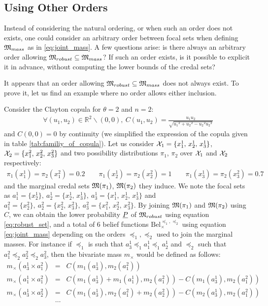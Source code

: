\subsection{Using Other Orders}
Instead of considering the natural ordering, or when such an order does not exists, one could consider an arbitrary order between focal sets when defining ${\mathfrak{M}}_{mass}$ as in \eqref{eq:joint_mass}. A few questions arise: is there always an arbitrary order allowing ${\mathfrak{M}}_{robust}\subseteq{\mathfrak{M}}_{mass}$? If such an order exists, is it possible to explicit it in advance, \ie without computing the lower bounds of the credal sets?

It appears that an order allowing ${\mathfrak{M}}_{robust}\subseteq{\mathfrak{M}}_{mass}$ does not always exist. To prove it, let us find an example where no order allows either inclusion.
\begin{example}
Consider the Clayton copula for $\theta=2$ and $n=2$:
\begin{eqnarray*}
    \forall (u_1,u_2)\in\mathbb{R}^2\backslash(0,0), ~C(u_1,u_2)=\frac{u_1u_2}{\sqrt{{u_1}^2+{u_2}^2-{u_2}^2{u_2}^2}}
\end{eqnarray*}
and $C(0,0)=0$ by continuity (we simplified the expression of the copula given in table \ref{tab:familiy_of_copula}). Let us consider ${\mathcal{X}}_1=\{x^1_1,\, x^1_2,\, x^1_3\}$, ${\mathcal{X}}_2=\{x^2_1,\, x^2_2,\, x^2_3\}$ and two possibility distributions $\pi_1$, $\pi_2$ over ${\mathcal{X}}_1$ and ${\mathcal{X}}_2$ respectively:
\begin{eqnarray*}
    \pi_1(x^1_1)=\pi_2(x^2_1)=0.2 \qquad \pi_1(x^1_2)=\pi_2(x^2_2)=1 \qquad \pi_1(x^1_3)=\pi_2(x^2_3)=0.7 
\end{eqnarray*}
and the marginal credal sets ${\mathfrak{M}}(\pi_1)$, ${\mathfrak{M}}(\pi_2)$ they induce. We note the focal sets as $a^1_1=\{x^1_2\},~a^1_2=\{x^1_2,\, x^1_3\},~a^1_3=\{x^1_1,\,x^1_2,\,x^1_3\}$ and $a^2_1=\{x^2_2\},~a^2_2=\{x^2_2,\, x^2_3\},~a^2_3=\{x^2_1,\, x^2_2,\, x^2_3\}$. By joining ${\mathfrak{M}}(\pi_1)$ and ${\mathfrak{M}}(\pi_2)$ using $C$, we can obtain the lower probability ${\underline{P}}$ of ${\mathfrak{M}}_{robust}$ using equation \eqref{eq:robust_set}, and a total of 6 belief functions $\mathrm{Bel}^{\preceq_1,\preceq_2}_\times$ using equation \eqref{eq:joint_mass} depending on the orders $\preceq_1, \preceq_2$ used to join the marginal masses. For instance if $\preceq_1$ is such that $a^1_3\preceq_1 a^1_1 \preceq_1 a^1_2$ and $\preceq_2$ such that $a^2_1 \preceq_2 a^2_2 \preceq_2 a^2_3$, then the bivariate mass $m_\times$ would be defined as follows:
\begin{eqnarray*}
    m_\times(a^1_3\times a^2_1) &=& C(m_1(a^1_3), m_2(a^2_1))\\
    m_\times(a^1_1\times a^2_1) &=& C(m_1(a^1_3)+m_1(a^1_1), m_2(a^2_1)) - C(m_1(a^1_3), m_2(a^2_1))\\
    m_\times(a^1_3\times a^2_2) &=& C(m_1(a^1_3), m_2(a^2_1) + m_2(a^2_2)) - C(m_2(a^1_3), m_2(a^2_1))\\
    &\dots&
\end{eqnarray*}


\end{example}
